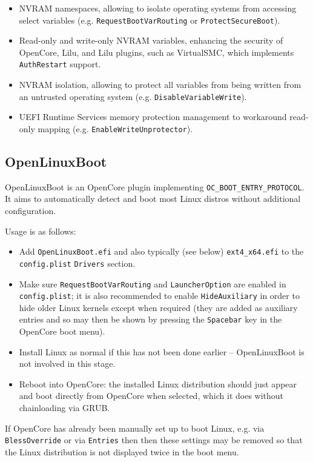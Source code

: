 \documentclass[]{article}
\makeatletter
\providecommand{\tightlist}{%
  \setlength{\itemsep}{0pt}\setlength{\parskip}{0pt}}
\renewcommand{\label}[1]{%
\zref@wrapper@immediate{\oldlabel{#1}}}  %
\makeatother
\begin{document}
\begin{itemize}
  \item NVRAM namespaces, allowing to isolate operating systems from accessing select
  variables (e.g. \texttt{RequestBootVarRouting} or \texttt{ProtectSecureBoot}).
  \item Read-only and write-only NVRAM variables, enhancing the security of OpenCore,
  Lilu, and Lilu plugins, such as VirtualSMC, which implements \texttt{AuthRestart} support.
  \item NVRAM isolation, allowing to protect all variables from being written from
  an untrusted operating system (e.g. \texttt{DisableVariableWrite}).
  \item UEFI Runtime Services memory protection management to workaround read-only
  mapping (e.g. \texttt{EnableWriteUnprotector}).
\end{itemize}

\subsection{OpenLinuxBoot}\label{uefilinux}

OpenLinuxBoot is an OpenCore plugin implementing \texttt{OC\_BOOT\_ENTRY\_PROTOCOL}.
It aims to automatically detect and boot most Linux distros without additional configuration.

Usage is as follows:

\begin{itemize}
\tightlist
  \item Add \texttt{OpenLinuxBoot.efi} and also typically (see below) \texttt{ext4\_x64.efi} to the \texttt{config.plist}
  \texttt{Drivers} section.
  \item Make sure \texttt{RequestBootVarRouting} and \texttt{LauncherOption} are enabled in \texttt{config.plist};
  it is also recommended to enable \texttt{HideAuxiliary} in order to hide older Linux kernels except when required
  (they are added as auxiliary entries and so may then be shown by pressing the \texttt{Spacebar} key in the OpenCore boot menu).
  \item Install Linux as normal if this has not been done earlier -- OpenLinuxBoot is not involved in this stage.
  \item Reboot into OpenCore: the installed Linux distribution should just appear and boot directly from OpenCore
  when selected, which it does without chainloading via GRUB.
\end{itemize}

If OpenCore has already been manually set up to boot Linux, e.g. via \texttt{BlessOverride} or via \texttt{Entries} then
then these settings may be removed so that the Linux distribution is not displayed twice in the boot menu.
\end{document}
